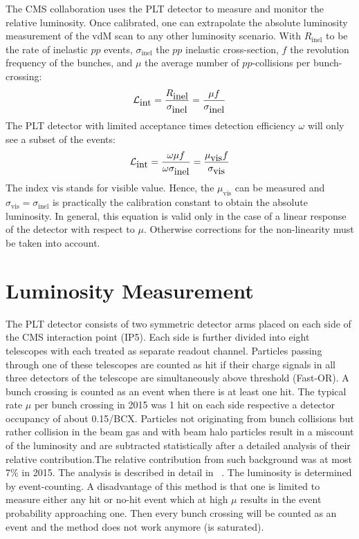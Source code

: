The CMS collaboration uses the PLT detector to measure and monitor the relative luminosity. 
Once calibrated, one can extrapolate the absolute luminosity measurement of the 
vdM scan to any other luminosity scenario. With $R_{\mbox{inel}}$ to be the rate of inelastic 
$pp$ events, $\sigma_{\mbox{inel}}$ the $pp$ inelastic cross-section, $f$ the revolution frequency 
of the bunches, and $\mu$ the average number of $pp$-collisions per bunch-crossing:
\begin{equation}
{\cal L}_{\mbox{int}} = \frac{R_{\mbox{inel}}}{\sigma_{\mbox{inel}}} = \frac{\mu f}{\sigma_{\mbox{inel}}}
\end{equation}
The PLT detector with limited acceptance times detection efficiency $\omega$ will only see a subset of the events:
\begin{equation}
{\cal L}_{\mbox{int}} = \frac{\omega \mu f}{\omega \sigma_{\mbox{inel}}} = \frac{\mu_{\mbox{vis}} f}{\sigma_{\mbox{vis}}}
\end{equation}
The index $\mbox{vis}$ stands for visible value. Hence, the $\mu_{\mbox{vis}}$ can be measured and
${\sigma_{\mbox{vis}}} = {\sigma_{\mbox{inel}}}$ is practically the calibration constant to obtain the absolute luminosity.
In general, this equation is valid only in the case of a linear response of the detector with 
respect to $\mu$. Otherwise corrections for the non-linearity must be taken into account.


\section {Luminosity Measurement} \label{sec:lumiMeasurement}
The PLT detector consists of two symmetric detector arms placed on each side of the CMS interaction point (IP5).
Each side is further divided into eight telescopes with each treated as separate readout channel. Particles passing
through one of these telescopes are counted as hit if their charge signals in all three detectors of the
telescope are simultaneously above threshold (Fast-OR). A bunch crossing is counted as an event when there is at least 
one hit. The typical rate $\mu$ per bunch crossing in 2015 was 1 hit on each side respective
a detector occupancy of about 0.15/BCX. Particles not originating from bunch collisions but rather
collision in the beam gas and with beam halo particles result in a miscount of the luminosity and
are subtracted statistically after a detailed analysis of their relative contribution.The relative
contribution from such background was at most 7\% in 2015. The analysis is described in detail in ~\cite{PLT:AN-16-002_v3}.
The luminosity is determined by event-counting. A disadvantage of this method is that one is
limited to measure either any hit or no-hit event which at high $\mu$ results in the event probability
approaching one. Then every bunch crossing will be counted as an event and the method does
not work anymore (is saturated). 

